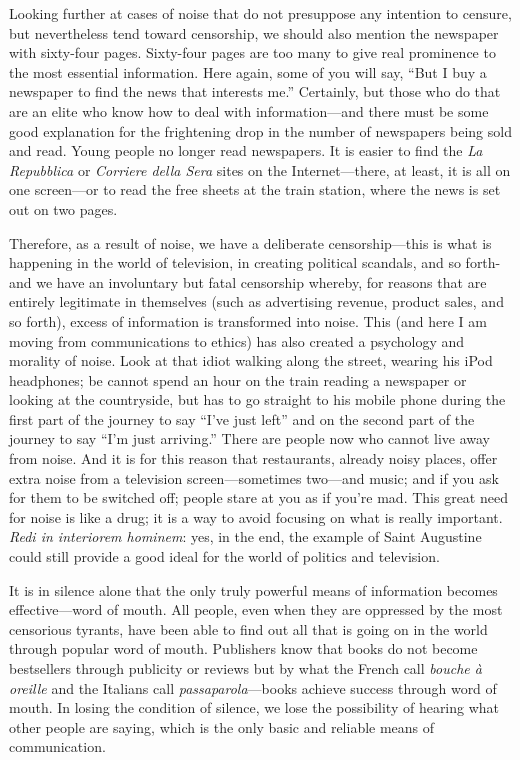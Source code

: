 \documentclass[11pt,twocolumn]{article}
\begin{document}
Looking further at cases of noise that do not presuppose any intention
to censure, but nevertheless tend toward censorship, we should also
mention the newspaper with sixty-four pages. Sixty-four pages are
too many to give real prominence to the most essential information.
Here again, some of you will say, ``But I buy a newspaper to find
the news that interests me.'' Certainly, but those who do that are
an elite who know how to deal with information---and there must be
some good explanation for the frightening drop in the number of
newspapers being sold and read. Young people no longer read newspapers.
It is easier to find the \emph{La Repubblica} or \emph{Corriere della Sera} sites
on the Internet---there, at least, it is all on one screen---or
to read the free sheets at the train station, where the news is set
out on two pages.

Therefore, as a result of noise, we have a deliberate censorship---this
is what is happening in the world of television, in creating political
scandals, and so forth-and we have an involuntary but fatal censorship
whereby, for reasons that are entirely legitimate in themselves
(such as advertising revenue, product sales, and so forth), excess
of information is transformed into noise.  This (and here I am
moving from communications to ethics) has also created a psychology
and morality of noise. Look at that idiot walking along the street,
wearing his iPod headphones; be cannot spend an hour on the train
reading a newspaper or looking at the countryside, but has to go
straight to his mobile phone during the first part of the journey
to say ``I've just left'' and on the second part of the journey to
say ``I'm just arriving.'' There are people now who cannot live
away from noise.  And it is for this reason that restaurants, already
noisy places, offer extra noise from a television screen---sometimes
two---and music; and if you ask for them to be switched off;
people stare at you as if you're mad. This great need for noise is
like a drug; it is a way to avoid focusing on what is really
important. \emph{Redi in interiorem hominem}: yes, in the end, the example
of Saint Augustine could still provide a good ideal for the world
of politics and television.

It is in silence alone that the only truly powerful means of
information becomes effective---word of mouth. All people, even when
they are oppressed by the most censorious tyrants, have been able
to find out all that is going on in the world through popular word
of mouth. Publishers know that books do not become bestsellers
through publicity or reviews but by what the French call \emph{bouche \`a oreille}
and
the Italians call \emph{passaparola}---books achieve success through word
of mouth. In losing the condition of silence, we lose the possibility
of hearing what other people are saying, which is the only basic
and reliable means of communication.
\end{document}

